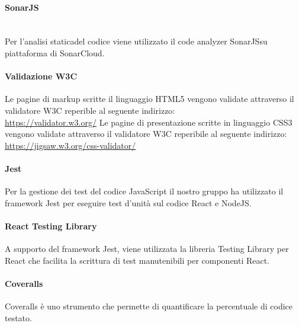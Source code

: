 	\paragraph{SonarJS}\mbox{}\\ [1mm]
	Per l'analisi statica\glosp del codice viene utilizzato il code analyzer SonarJS\glosp su piattaforma di SonarCloud.
	\paragraph{Validazione W3C}
	Le pagine di markup scritte il linguaggio HTML5 vengono validate attraverso il validatore W3C reperible al seguente indirizzo:\\ \url{https://validator.w3.org/}
	Le pagine di presentazione scritte in linguaggio CSS3 vengono validate attraverso il validatore W3C reperibile al seguente indirizzo:\\ \url{https://jigsaw.w3.org/css-validator/}
	\paragraph{Jest}
	Per la gestione dei test del codice JavaScript il nostro gruppo ha utilizzato il framework Jest per eseguire test d'unità sul codice React e NodeJS.
	\paragraph{React Testing Library}
	A supporto del framework Jest, viene utilizzata la libreria Testing Library per React che facilita la scrittura di test manutenibili per componenti React.
	\paragraph{Coveralls}
	Coveralls è uno strumento che permette di quantificare la percentuale di codice testato.
